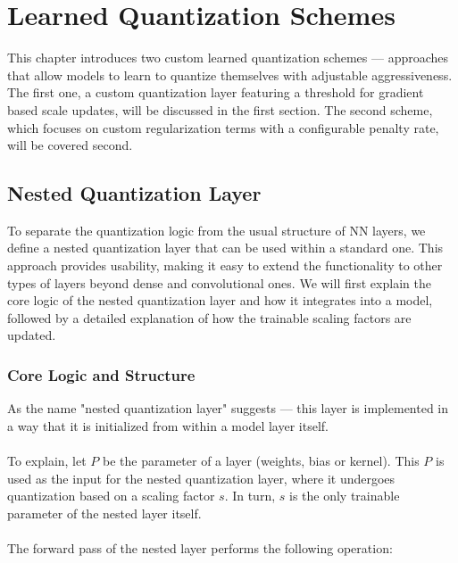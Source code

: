 \chapter{Learned Quantization\label{cha:chapter3} Schemes}
This chapter introduces two custom learned quantization schemes — approaches that allow models to learn to quantize themselves
with adjustable aggressiveness. The first one, a custom quantization layer featuring a threshold for gradient based scale updates,
will be discussed in the first section. The second scheme, which focuses on custom regularization terms with a configurable penalty rate,
will be covered second.


\section{Nested Quantization Layer}
\label{sec:nestedquantizationlayer}
To separate the quantization logic from the usual structure of NN layers,
we define a nested quantization layer that can be used within a standard one. 
This approach provides usability, making it easy to extend the functionality to other types of layers beyond dense and convolutional ones.
We will first explain the core logic of the nested quantization layer and how it integrates into a model,
followed by a detailed explanation of how the trainable scaling factors are updated.



\subsection{Core Logic and Structure}
\label{subsec:quantizedconvolutional}

As the name "nested quantization layer" suggests —
this layer is implemented in a way that it is initialized from within a model layer itself.
\\
\\
To explain, let \( P \) be the parameter of a layer (weights, bias or kernel). This \( P \) is used
as the input for the nested quantization layer, where it undergoes quantization based on 
a scaling factor \( s \). In turn, \( s \) is the only trainable parameter of the nested layer itself.
\\
\\
The forward pass of the nested layer performs the following operation:

